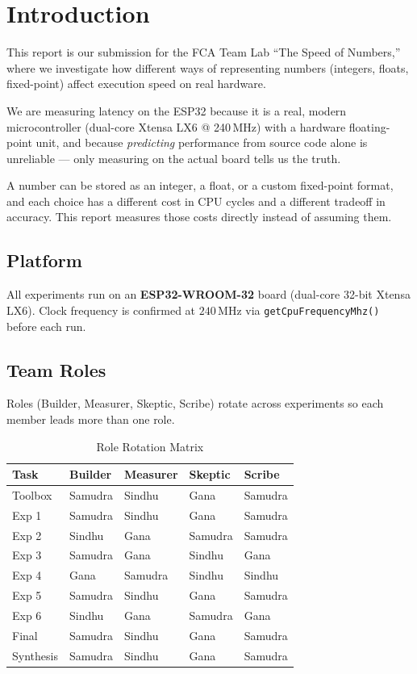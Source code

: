 \section{Introduction}

This report is our submission for the FCA Team Lab ``The Speed of Numbers,'' where we investigate how different ways of representing numbers (integers, floats, fixed-point) affect execution speed on real hardware.

We are measuring latency on the ESP32 because it is a real, modern microcontroller (dual-core Xtensa LX6 @ 240\,MHz) with a hardware floating-point unit, and because \emph{predicting} performance from source code alone is unreliable --- only measuring on the actual board tells us the truth.

A number can be stored as an integer, a float, or a custom fixed-point format, and each choice has a different cost in CPU cycles and a different tradeoff in accuracy. This report measures those costs directly instead of assuming them.

\subsection{Platform}
All experiments run on an \textbf{ESP32-WROOM-32} board (dual-core 32-bit Xtensa LX6). Clock frequency is confirmed at $240\,\text{MHz}$ via \texttt{getCpuFrequencyMhz()} before each run.

\subsection{Team Roles}
Roles (Builder, Measurer, Skeptic, Scribe) rotate across experiments so each member leads more than one role.

\begin{table}[htbp]
\centering
\caption{Role Rotation Matrix}
\label{tab:role_matrix}
\small
\begin{tabularx}{\textwidth}{l X X X X}
\toprule
\textbf{Task} & \textbf{Builder} & \textbf{Measurer} & \textbf{Skeptic} & \textbf{Scribe} \\
\midrule
\rowcolor{tableStripe}
Toolbox & Samudra & Sindhu & Gana & Samudra \\
Exp 1 & Samudra & Sindhu & Gana & Samudra \\
\rowcolor{tableStripe}
Exp 2 & Sindhu & Gana & Samudra & Samudra \\
Exp 3 & Samudra & Gana & Sindhu & Gana \\
\rowcolor{tableStripe}
Exp 4 & Gana & Samudra & Sindhu & Sindhu \\
Exp 5 & Samudra & Sindhu & Gana & Samudra \\
\rowcolor{tableStripe}
Exp 6 & Sindhu & Gana & Samudra & Gana \\
Final & Samudra & Sindhu & Gana & Samudra \\
\rowcolor{tableStripe}
Synthesis & Samudra & Sindhu & Gana & Samudra \\
\bottomrule
\end{tabularx}
\end{table}

